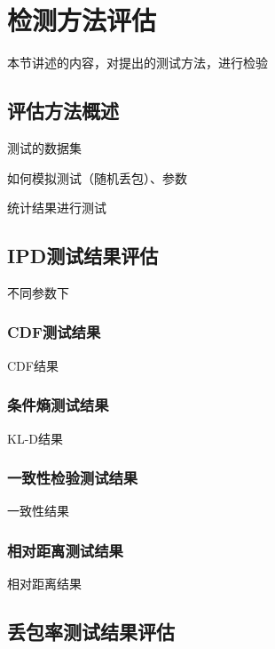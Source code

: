 \section{检测方法评估}
\label{chap:analyze:result}

本节讲述的内容，对提出的测试方法，进行检验

\subsection{评估方法概述}
\label{chap:analyze:result:abstract}

测试的数据集

如何模拟测试（随机丢包）、参数

统计结果进行测试

\subsection{IPD测试结果评估}
\label{chap:analyze:result:ipd}

不同参数下

\subsubsection{CDF测试结果}
\label{chap:analyze:result:ipd:cdf}

CDF结果

\subsubsection{条件熵测试结果}
\label{chap:analyze:result:ipd:kld}

KL-D结果

\subsubsection{一致性检验测试结果}
\label{chap:analyze:result:ipd:statistical}

一致性结果

\subsubsection{相对距离测试结果}
\label{chap:analyze:result:ipd:distance}

相对距离结果

\subsection{丢包率测试结果评估}
\label{chap:analyze:result:window}

